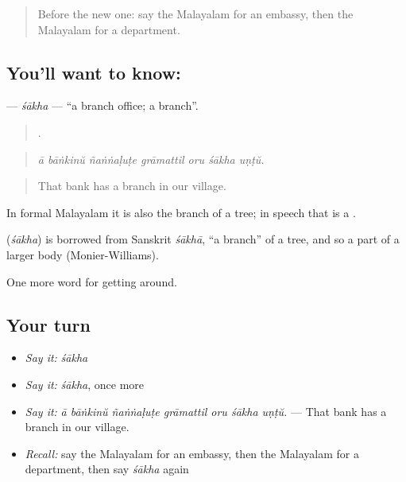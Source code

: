 \label{lesson:ML-C486-sakha}



\begin{quote}
Before the new one: say the Malayalam for an embassy, then the Malayalam for a department.
\end{quote}

\subsection*{You'll want to know: }
\textbf{} — \emph{śākha} — \textquotedblleft{}a branch office; a branch\textquotedblright{}.

\begin{quote}
      .
\end{quote}

\begin{quote}
\emph{ā bāṅkinŭ ñaṅṅaḷuṭe grāmattil oru śākha uṇṭŭ.}
\end{quote}

\begin{quote}
That bank has a branch in our village.
\end{quote}

In formal Malayalam it is also the branch of a tree; in speech that is a .

\begin{cousinweb}
\textbf{} (\emph{śākha}) is borrowed from Sanskrit \emph{śākhā}, \textquotedblleft{}a branch\textquotedblright{} of a tree, and so a part of a larger body (Monier-Williams).
\end{cousinweb}

\begin{grammarlens}[title={What you've built}]
One more word for getting around.
\end{grammarlens}

\subsection*{Your turn}
\begin{itemize}
\raggedright
  \item \emph{Say it:} \emph{śākha}
  \item \emph{Say it:} \emph{śākha}, once more
  \item \emph{Say it:} \emph{ā bāṅkinŭ ñaṅṅaḷuṭe grāmattil oru śākha uṇṭŭ.} — That bank has a branch in our village.
  \item \emph{Recall:} say the Malayalam for an embassy, then the Malayalam for a department, then say \emph{śākha} again
\end{itemize}

